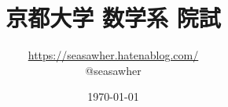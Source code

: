 \documentclass[12pt]{jsarticle}%
\begin{document}
\title{京都大学 数学系 院試}
\author{\url{https://seasawher.hatenablog.com/} \\ @seasawher}
\date{\today}
\maketitle



\newpage



\newpage




\newpage


\end{document}
